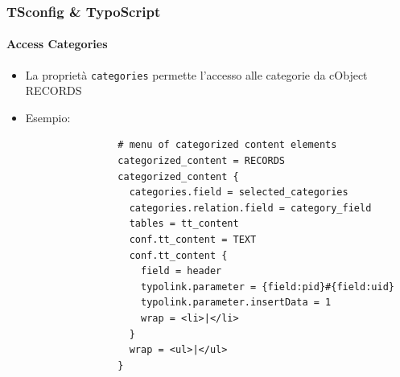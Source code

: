 
\begin{frame}[fragile]
	\frametitle{TSconfig \& TypoScript}
	\framesubtitle{Access Categories}

	\begin{itemize}
		\item La proprietà \texttt{categories} permette l'accesso alle categorie\newline
			da cObject RECORDS

		\item Esempio:

			\lstset{
				basicstyle=\tiny\ttfamily
			}

			\begin{lstlisting}
				# menu of categorized content elements
				categorized_content = RECORDS
				categorized_content {
				  categories.field = selected_categories
				  categories.relation.field = category_field
				  tables = tt_content
				  conf.tt_content = TEXT
				  conf.tt_content {
				    field = header
				    typolink.parameter = {field:pid}#{field:uid}
				    typolink.parameter.insertData = 1
				    wrap = <li>|</li>
				  }
				  wrap = <ul>|</ul>
				}
			\end{lstlisting}

	\end{itemize}

\end{frame}


